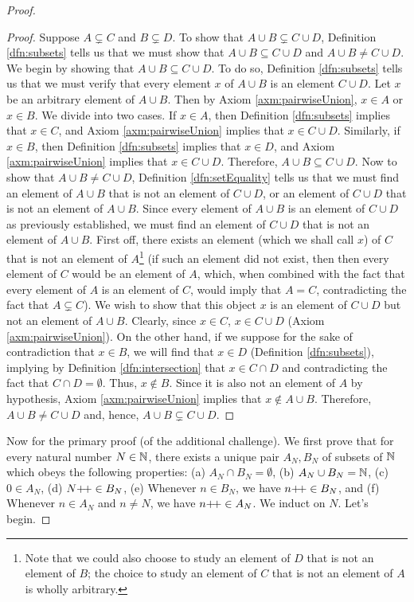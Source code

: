 \documentclass[../main.tex]{subfiles}
\begin{document}
\begin{enumerate}[ref={\thesection.\arabic*}]
\begin{proof}
\begin{lem}
            \begin{proof}
                Suppose $A\subsetneq C$ and $B\subsetneq D$. To show that $A\cup B\subsetneq C\cup D$, Definition \ref{dfn:subsets} tells us that we must show that $A\cup B\subseteq C\cup D$ and $A\cup B\neq C\cup D$. We begin by showing that $A\cup B\subseteq C\cup D$. To do so, Definition \ref{dfn:subsets} tells us that we must verify that every element $x$ of $A\cup B$ is an element $C\cup D$. Let $x$ be an arbitrary element of $A\cup B$. Then by Axiom \ref{axm:pairwiseUnion}, $x\in A$ or $x\in B$. We divide into two cases. If $x\in A$, then Definition \ref{dfn:subsets} implies that $x\in C$, and Axiom \ref{axm:pairwiseUnion} implies that $x\in C\cup D$. Similarly, if $x\in B$, then Definition \ref{dfn:subsets} implies that $x\in D$, and Axiom \ref{axm:pairwiseUnion} implies that $x\in C\cup D$. Therefore, $A\cup B\subseteq C\cup D$. Now to show that $A\cup B\neq C\cup D$, Definition \ref{dfn:setEquality} tells us that we must find an element of $A\cup B$ that is not an element of $C\cup D$, or an element of $C\cup D$ that is not an element of $A\cup B$. Since every element of $A\cup B$ is an element of $C\cup D$ as previously established, we must find an element of $C\cup D$ that is not an element of $A\cup B$. First off, there exists an element (which we shall call $x$) of $C$ that is not an element of $A$\footnote{Note that we could also choose to study an element of $D$ that is not an element of $B$; the choice to study an element of $C$ that is not an element of $A$ is wholly arbitrary.} (if such an element did not exist, then then every element of $C$ would be an element of $A$, which, when combined with the fact that every element of $A$ is an element of $C$, would imply that $A=C$, contradicting the fact that $A\subsetneq C$). We wish to show that this object $x$ is an element of $C\cup D$ but not an element of $A\cup B$. Clearly, since $x\in C$, $x\in C\cup D$ (Axiom \ref{axm:pairwiseUnion}). On the other hand, if we suppose for the sake of contradiction that $x\in B$, we will find that $x\in D$ (Definition \ref{dfn:subsets}), implying by Definition \ref{dfn:intersection} that $x\in C\cap D$ and contradicting the fact that $C\cap D=\emptyset$. Thus, $x\notin B$. Since it is also not an element of $A$ by hypothesis, Axiom \ref{axm:pairwiseUnion} implies that $x\notin A\cup B$. Therefore, $A\cup B\neq C\cup D$ and, hence, $A\cup B\subsetneq C\cup D$.
            \end{proof}
        \end{lem}
        Now for the primary proof (of the additional challenge). We first prove that for every natural number $N\in\mathbb{N}$, there exists a unique pair $A_N,B_N$ of subsets of $\mathbb{N}$ which obeys the following properties: (a) $A_N\cap B_N=\emptyset$, (b) $A_N\cup B_N=\mathbb{N}$, (c) $0\in A_N$, (d) $N{+\!+}\in B_N$, (e) Whenever $n\in B_N$, we have $n{+\!+}\in B_N$, and (f) Whenever $n\in A_N$ and $n\neq N$, we have $n{+\!+}\in A_N$. We induct on $N$. Let's begin.\par

\end{proof}
\end{enumerate}
\end{document}

